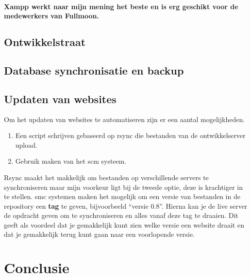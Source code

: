 \documentclass[12pt,a4paper]{article}
\begin{document}
    \paragraph{Xampp werkt naar mijn mening het beste en is erg geschikt voor de medewerkers van Fullmoon.}
    
    \subsection{Ontwikkelstraat}
    
    
    
    \subsection{Database synchronisatie en backup}
    
    
    
    \subsection{Updaten van websites}
  
    Om het updaten van websites te automatiseren zijn er een aantal mogelijkheden. 
    
    \begin{enumerate}
      \item Een script schrijven gebaseerd op {\sc rsync} die bestanden van de ontwikkelserver upload.
      \item Gebruik maken van het {\sc scm} systeem.
    \end{enumerate}
    
    Rsync maakt het makkelijk om bestanden op verschillende servers te synchroniseren maar mijn voorkeur ligt bij de tweede optie, deze is krachtiger in te stellen.
    {\sc smc} systemen maken het mogelijk om een versie van bestanden in de repository een \textbf{tag} te geven, bijvoorbeeld ``versie 0.8''. Hierna kan je de live server de opdracht geven om te synchroniseren en alles vanaf deze tag te draaien. Dit geeft als voordeel dat je gemakkelijk kunt zien welke versie een website draait en dat je gemakkelijk terug kunt gaan naar een voorlopende versie.
    
  \section{Conclusie}
\end{document}
